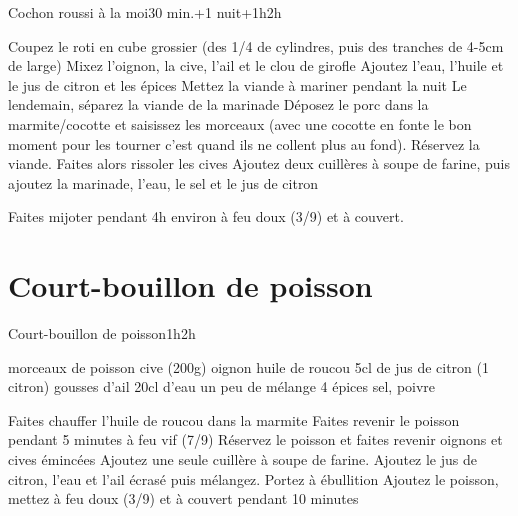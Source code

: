 {\begin{recette}{Cochon roussi à la moi}{}{30 min.+1 nuit+1h}{2h}
\begin{preparation}
\etape Coupez le roti en cube grossier (des 1/4 de cylindres, puis des tranches de 4-5cm de large)
\etape Mixez l'oignon, la cive, l'ail et le clou de girofle
\etape Ajoutez l'eau, l'huile et le jus de citron et les épices
\etape Mettez la viande à mariner pendant la nuit
\etape Le lendemain, séparez la viande de la marinade
\etape Déposez le porc dans la marmite/cocotte et saisissez les morceaux (avec une cocotte en fonte le bon moment pour les tourner c'est quand ils ne collent plus au fond).
\etape Réservez la viande. Faites alors rissoler les cives
\etape Ajoutez deux cuillères à soupe de farine, puis ajoutez la marinade, l'eau, le sel et le jus de citron
\end{preparation}

\begin{cuisson}
Faites mijoter pendant 4h environ à feu doux (3/9) et à couvert.
\end{cuisson}
\end{recette}


\section{Court-bouillon de poisson}
\begin{recette}{Court-bouillon de poisson}{}{1h}{2h}
\begin{ingredients}
\ingredient morceaux de poisson
 cive (200g)
 oignon
\ingredient huile de roucou
\ingredient 5cl de jus de citron (1 citron)
 gousses d'ail
\ingredient 20cl d'eau
\ingredient un peu de mélange 4 épices
\ingredient sel, poivre
\end{ingredients}

\begin{preparation}
\etape Faites chauffer l'huile de roucou dans la marmite
\etape Faites revenir le poisson pendant 5 minutes à feu vif (7/9)
\etape Réservez le poisson et faites revenir oignons et cives émincées
\etape Ajoutez une seule cuillère à soupe de farine. Ajoutez le jus de citron, l'eau et l'ail écrasé puis mélangez. 
\etape Portez à ébullition
\etape Ajoutez le poisson, mettez à feu doux (3/9) et à couvert pendant 10 minutes
\end{preparation}
\end{recette}

}
